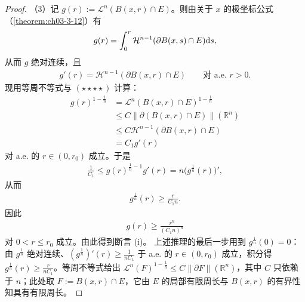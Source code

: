 \documentclass[../../main.tex]{subfiles}%
\begin{document}
\begin{proof}
（3）记 $g(r):=\mathcal{L}^n(B(x,r)\cap E)$。则由关于 $x$ 的极坐标公式（\cref{theorem:ch03-3-12}）有%
\begin{align*}
g(r)=\int_0^r\mathcal{H}^{n-1}(\partial B(x,s)\cap E)\mathrm{d} s,
\end{align*}
从而 $g$ 绝对连续，且
\begin{align*}
g'(r)=\mathcal{H}^{n-1}(\partial B(x,r)\cap E)\qquad\text{对 a.e. }r>0 .
\end{align*}
现用等周不等式与 $(\star\star\star\star)$ 计算：
\begin{align*}
g(r)^{1-\frac{1}{n}}
&=\mathcal{L}^n(B(x,r)\cap E)^{1-\frac{1}{n}}\\
&\leqslant C\lVert\partial(B(x,r)\cap E)\rVert(\mathbb{R}^n)\\
&\leqslant C\mathcal{H}^{n-1}(\partial B(x,r)\cap E)\\
&=C_1g'(r)
\end{align*}
对 a.e. 的 $r\in(0,r_0)$ 成立。于是
\begin{align*}
\frac{1}{C_1}\leqslant g(r)^{\frac{1}{n}-1}g'(r)=n\bigl(g^{\frac{1}{n}}(r)\bigr)',
\end{align*}
从而
\begin{align*}
g^{\frac{1}{n}}(r)\geqslant\frac{r}{C_1n}.
\end{align*}
因此
\begin{align*}
g(r)\geqslant\frac{r^n}{(C_1n)^n}
\end{align*}
对 $0<r\leqslant r_0$ 成立。由此得到断言 (i)。
上述推理的最后一步用到 $g^{\frac{1}{n}}(0)=0$：由 $g^{\frac{1}{n}}$ 绝对连续、$(g^{\frac{1}{n}})'(r)\geqslant\frac{1}{nC_1}$ 于 a.e. 的 $r\in(0,r_0)$ 成立，积分得 $g^{\frac{1}{n}}(r)\geqslant\frac{r}{nC_1}$。等周不等式给出 $\mathcal{L}^n(F)^{1-\frac{1}{n}}\leqslant C\lVert\partial F\rVert(\mathbb{R}^n)$，其中 $C$ 只依赖于 $n$；此处取 $F:=B(x,r)\cap E$，它由 $E$ 的局部有限周长与 $B(x,r)$ 的有界性知具有有限周长。


\end{proof}
\end{document}
